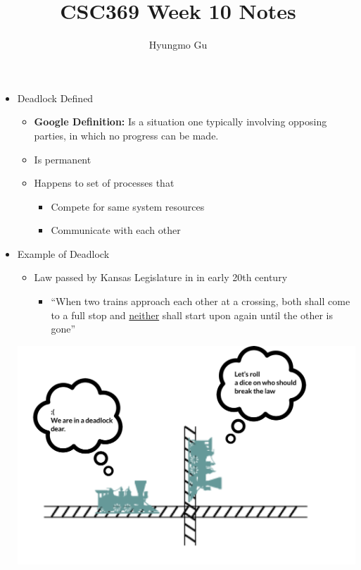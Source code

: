 \documentclass[12pt]{article}
\begin{document}
\title{CSC369 Week 10 Notes}
\author{Hyungmo Gu}
\maketitle

\begin{itemize}
    \item Deadlock Defined
    \begin{itemize}
        \item \textbf{Google Definition:} Is a situation one typically involving
        opposing parties, in which no progress can be made.
        \item Is permanent
        \item Happens to set of processes that

        \begin{itemize}
            \item Compete for same system resources
            \item Communicate with each other
        \end{itemize}
    \end{itemize}
    \item Example of Deadlock
    \begin{itemize}
        \item Law passed by Kansas Legislature in in early 20th century
        \begin{itemize}
            \item ``When two trains approach each other at a crossing, both shall
            come to a full stop and \underline{neither} shall start upon again
            until the other is gone''
        \end{itemize}
    \end{itemize}

    \begin{center}
        \includegraphics[width=0.8\linewidth]{../images/week_10_notes_1_1.png}
    \end{center}



\end{itemize}
\end{document}
